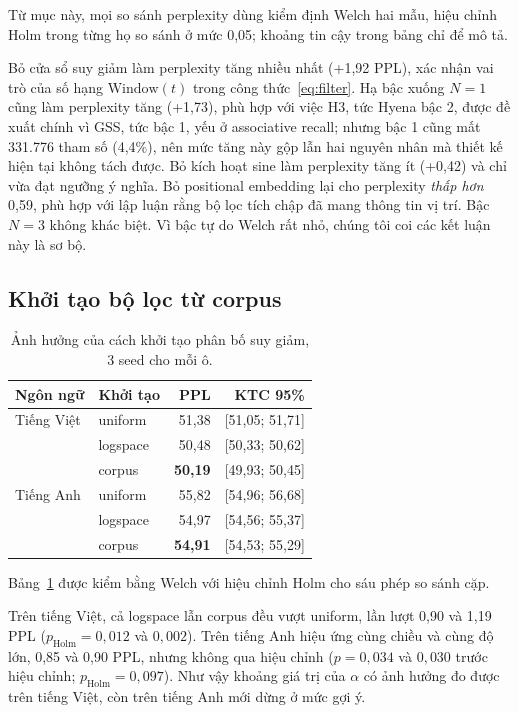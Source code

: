 \documentclass[11pt]{article}
\begin{document}
Từ mục này, mọi so sánh perplexity dùng kiểm định Welch hai mẫu, hiệu chỉnh Holm
trong từng họ so sánh ở mức 0,05; khoảng tin cậy trong bảng chỉ để mô tả.

Bỏ cửa sổ suy giảm làm perplexity tăng nhiều nhất (+1,92 PPL), xác nhận vai trò của số
hạng $\mathrm{Window}(t)$ trong công thức~\eqref{eq:filter}. Hạ bậc xuống $N=1$
cũng làm perplexity tăng (+1,73), phù hợp với việc H3, tức Hyena bậc 2, được đề xuất
chính vì GSS, tức bậc 1, yếu ở associative recall; nhưng bậc 1 cũng mất 331.776
tham số (4,4\%), nên mức tăng này gộp lẫn hai nguyên nhân mà thiết kế hiện tại
không tách được. Bỏ kích hoạt sine làm perplexity tăng ít (+0,42) và chỉ vừa
đạt ngưỡng ý nghĩa. Bỏ positional embedding lại cho perplexity \emph{thấp hơn} 0,59, phù hợp
với lập luận rằng bộ lọc tích chập đã mang thông tin vị trí. Bậc $N=3$ không
khác biệt. Vì bậc tự do Welch rất nhỏ, chúng tôi coi các kết luận này là sơ bộ.

\subsection{Khởi tạo bộ lọc từ corpus}
\label{sec:e4text}

\begin{table}[t]
\centering
\small
\begin{tabular}{llrr}
\toprule
Ngôn ngữ & Khởi tạo & PPL & KTC 95\% \\
\midrule
Tiếng Việt & \textsf{uniform}  & 51,38 & [51,05; 51,71] \\
           & \textsf{logspace} & 50,48 & [50,33; 50,62] \\
           & corpus            & \textbf{50,19} & [49,93; 50,45] \\
\midrule
Tiếng Anh  & \textsf{uniform}  & 55,82 & [54,96; 56,68] \\
           & \textsf{logspace} & 54,97 & [54,56; 55,37] \\
           & corpus            & \textbf{54,91} & [54,53; 55,29] \\
\bottomrule
\end{tabular}
\caption{Ảnh hưởng của cách khởi tạo phân bố suy giảm, 3 seed cho mỗi ô.}
\label{tab:e4}
\end{table}

Bảng~\ref{tab:e4} được kiểm bằng Welch với hiệu chỉnh Holm cho sáu phép so sánh
cặp.

Trên tiếng Việt, cả \textsf{logspace} lẫn corpus đều vượt \textsf{uniform}, lần
lượt 0,90 và 1,19 PPL ($p_{\text{Holm}} = 0{,}012$ và $0{,}002$). Trên tiếng Anh
hiệu ứng cùng chiều và cùng độ lớn, 0,85 và 0,90 PPL, nhưng không qua hiệu chỉnh
($p = 0{,}034$ và $0{,}030$ trước hiệu chỉnh; $p_{\text{Holm}} = 0{,}097$). Như
vậy khoảng giá trị của $\alpha$ có ảnh hưởng đo được trên tiếng Việt, còn trên
tiếng Anh mới dừng ở mức gợi ý.
\end{document}
